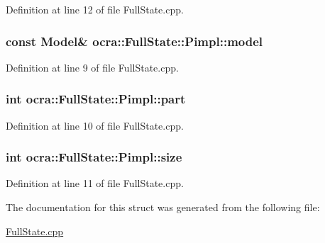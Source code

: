 Definition at line 12 of file Full\+State.\+cpp.

\subsubsection[{\texorpdfstring{model}{model}}]{\setlength{\rightskip}{0pt plus 5cm}const {\bf Model}\& ocra\+::\+Full\+State\+::\+Pimpl\+::model}\hypertarget{structocra_1_1FullState_1_1Pimpl_ac8e2409d7e4a099fdb6fc3ef9c7d3026}{}\label{structocra_1_1FullState_1_1Pimpl_ac8e2409d7e4a099fdb6fc3ef9c7d3026}


Definition at line 9 of file Full\+State.\+cpp.

\subsubsection[{\texorpdfstring{part}{part}}]{\setlength{\rightskip}{0pt plus 5cm}int ocra\+::\+Full\+State\+::\+Pimpl\+::part}\hypertarget{structocra_1_1FullState_1_1Pimpl_ab10f6e199d008d84731024cb80772a5d}{}\label{structocra_1_1FullState_1_1Pimpl_ab10f6e199d008d84731024cb80772a5d}


Definition at line 10 of file Full\+State.\+cpp.

\subsubsection[{\texorpdfstring{size}{size}}]{\setlength{\rightskip}{0pt plus 5cm}int ocra\+::\+Full\+State\+::\+Pimpl\+::size}\hypertarget{structocra_1_1FullState_1_1Pimpl_a5deca911251aa5b774b3cf7f3f6bd5d4}{}\label{structocra_1_1FullState_1_1Pimpl_a5deca911251aa5b774b3cf7f3f6bd5d4}


Definition at line 11 of file Full\+State.\+cpp.



The documentation for this struct was generated from the following file\+:\begin{DoxyCompactItemize}
\item 
\hyperlink{FullState_8cpp}{Full\+State.\+cpp}\end{DoxyCompactItemize}
